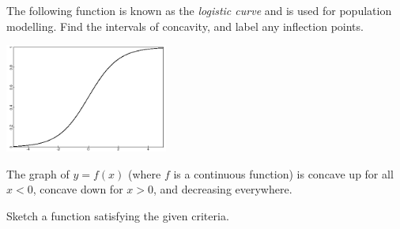 \begin{questions}
  \questioA The following function is known as the \textit{logistic curve} and is used for population modelling. Find the intervals of
            concavity, and label any inflection points.
            \begin{center}
              \includegraphics[width=0.4\textwidth]{logistic}
            \end{center}
  \questioM The graph of $ y = f(x) $ (where $ f $ is a continuous function) is concave up for all $ x < 0 $, concave down for $ x > 0 $, and decreasing everywhere.
  \questioM Sketch a function satisfying the given criteria.
\end{questions}
